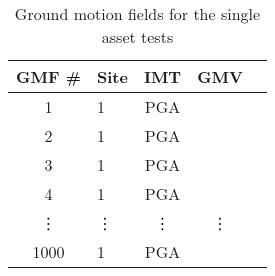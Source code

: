 \begin{table}

\centering
\begin{tabular}{ c l c c l }

\hline
\rowcolor{anti-flashwhite}
\bf{GMF #} & \bf{Site} & \bf{IMT} & \bf{GMV}\\
\hline
1 & 1 & PGA &  \\
2 & 1 & PGA &  \\
3 & 1 & PGA &  \\
4 & 1 & PGA &  \\
\vdots & \vdots & \vdots & \vdots \\
1000 & 1 & PGA &  \\
\hline
\end{tabular}

\caption{Ground motion fields for the single asset tests}
\label{tab:scenario-gmfs-single}
\end{table}